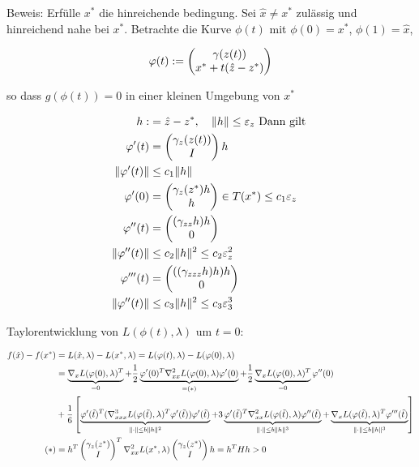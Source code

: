 Beweis: Erfülle $x^*$ die hinreichende bedingung. Sei $\hat x \neq x^*$ zulässig und hinreichend nahe bei $x^*$. Betrachte die Kurve $\phi(t)$ mit $\phi(0) = x^*$, $\phi(1) = \hat x$,

\[ \varphi(t) := \begin{pmatrix} \gamma(z(t)) \\ x^* + t(\hat z - z^*) \end{pmatrix} \]

so dass $g(\phi(t)) = 0$ in einer kleinen Umgebung von $x^*$

\begin{align*}
h :&= \hat z - z^*, \quad \|h\| \leq \varepsilon_z \text{ Dann gilt } \\
\varphi'(t) &= \begin{pmatrix} \gamma_z(z(t)) \\ I \end{pmatrix} h\\
\|\varphi'(t)\| & \leq c_1 \|h\| \\
\varphi'(0) &= \begin{pmatrix} \gamma_z (z^*) h \\ h \end{pmatrix} \in T(x^*) \leq c_1 \varepsilon_z \\
\varphi''(t) &= \begin{pmatrix} (\gamma_{zz} h)h \\ 0 \end{pmatrix} \\
\|\varphi''(t)\| & \leq c_2 \|h\|^2 \leq c_2 \varepsilon_z^2 \\
\varphi'''(t) &= \begin{pmatrix} ((\gamma_{zzz} h)h)h \\ 0 \end{pmatrix}\\
\|\varphi''(t)\| &\leq c_3 \|h\|^2 \leq c_3 \varepsilon_3^3 \\
\end{align*}

Taylorentwicklung von $L(\phi(t),\lambda)$ um $t=0$:


\begin{align*}
f(\hat x) - f(x^*) &= L(\hat x, \lambda) - L(x^*, \lambda) = L(\varphi(t),\lambda) - L(\varphi(0), \lambda) \\
&= \underbrace{\nabla_x L(\varphi(0), \lambda)^T}_{=0} + \frac 12 \underbrace{ \varphi'(0)^T \nabla_{xx}^2 L(\varphi(0),\lambda) \varphi'(0)}_{= (*) } + \frac 12 \underbrace{\nabla_x L(\varphi(0), \lambda)^T}_{=0} \varphi''(0) \\
&+ \frac 16 \left[ \underbrace{\varphi'(\tilde t)^T ( \nabla_{xxx}^3 L(\varphi(\tilde t),\lambda)^T \varphi'(\tilde t)) \varphi'(\tilde t)}_{\|\cdot\| \leq b \|h\|^2} + 3 \underbrace{\varphi'(\tilde t)^T \nabla_{xx}^2 L(\varphi(\tilde t), \lambda) \varphi''(\tilde t)}_{\|\cdot\| \leq b \|h\|^3} + \underbrace{\nabla_x L(\varphi(\tilde t), \lambda)^T \varphi'''(\tilde t)}_{\|\cdot\| \leq b \|h\|^3} \right] \\
(*) &= h^T \begin{pmatrix} \gamma_z(z^*) \\ I \end{pmatrix}^T \nabla_{xx}^2 L(x^*, \lambda) \begin{pmatrix} \gamma_z(z^*) \\ I \end{pmatrix} h = h^T H h > 0 \\
\end{align*}

